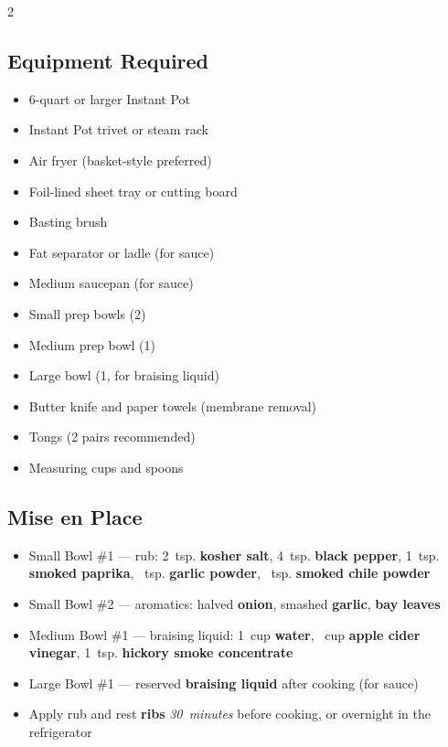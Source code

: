 \documentclass[11pt,letterpaper]{article}
\begin{document}
{\footnotesize
\setlength{\columnsep}{20pt}
\setlength{\multicolsep}{6pt}
\begin{multicols}{2}
\setlength{\parindent}{0pt}
\setlength{\parskip}{2pt}
\setlength{\itemsep}{0pt}
\setlength{\parsep}{0pt}

\subsection*{Equipment Required}
\begin{itemize}
    \item 6-quart or larger Instant Pot
    \item Instant Pot trivet or steam rack
    \item Air fryer (basket-style preferred)
    \item Foil-lined sheet tray or cutting board
    \item Basting brush
    \item Fat separator or ladle (for sauce)
    \item Medium saucepan (for sauce)
    \item Small prep bowls (2)
    \item Medium prep bowl (1)
    \item Large bowl (1, for braising liquid)
    \item Butter knife and paper towels (membrane removal)
    \item Tongs (2 pairs recommended)
    \item Measuring cups and spoons
\end{itemize}

\subsection*{Mise en Place}
\begin{itemize}
    \item Small Bowl \#1 --- rub: 2~tsp. \textbf{kosher salt}, 4~tsp. \textbf{black pepper}, 1~tsp. \textbf{smoked paprika}, ~tsp. \textbf{garlic powder}, ~tsp. \textbf{smoked chile powder}
    \item Small Bowl \#2 --- aromatics: halved \textbf{onion}, smashed \textbf{garlic}, \textbf{bay leaves}
    \item Medium Bowl \#1 --- braising liquid: 1~cup \textbf{water}, ~cup \textbf{apple cider vinegar}, 1~tsp. \textbf{hickory smoke concentrate}
    \item Large Bowl \#1 --- reserved \textbf{braising liquid} after cooking (for sauce)
    \item Apply rub and rest \textbf{ribs} \textit{30~minutes} before cooking, or overnight in the refrigerator
\end{itemize}


\end{multicols}}
\end{document}
